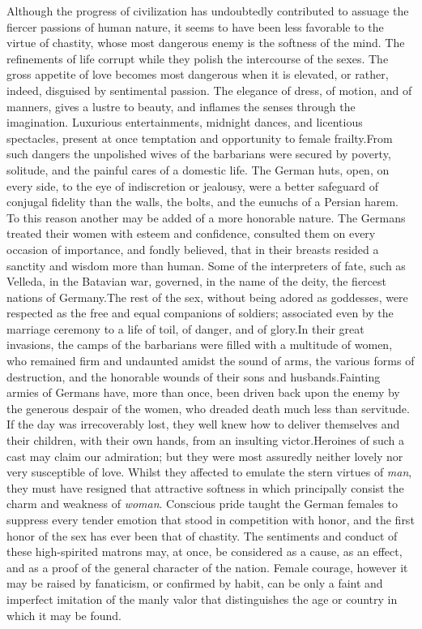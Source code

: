 Although the progress of civilization has undoubtedly contributed
to assuage the fiercer passions of human nature, it seems to have
been less favorable to the virtue of chastity, whose most
dangerous enemy is the softness of the mind. The refinements of
life corrupt while they polish the intercourse of the sexes. The
gross appetite of love becomes most dangerous when it is
elevated, or rather, indeed, disguised by sentimental passion.
The elegance of dress, of motion, and of manners, gives a lustre
to beauty, and inflames the senses through the imagination.
Luxurious entertainments, midnight dances, and licentious
spectacles, present at once temptation and opportunity to female
frailty.\footnotemark[57] From such dangers the unpolished wives of the
barbarians were secured by poverty, solitude, and the painful
cares of a domestic life. The German huts, open, on every side,
to the eye of indiscretion or jealousy, were a better safeguard
of conjugal fidelity than the walls, the bolts, and the eunuchs
of a Persian harem. To this reason another may be added of a more
honorable nature. The Germans treated their women with esteem and
confidence, consulted them on every occasion of importance, and
fondly believed, that in their breasts resided a sanctity and
wisdom more than human. Some of the interpreters of fate, such as
Velleda, in the Batavian war, governed, in the name of the deity,
the fiercest nations of Germany.\footnotemark[58] The rest of the sex, without
being adored as goddesses, were respected as the free and equal
companions of soldiers; associated even by the marriage ceremony
to a life of toil, of danger, and of glory.\footnotemark[59] In their great
invasions, the camps of the barbarians were filled with a
multitude of women, who remained firm and undaunted amidst the
sound of arms, the various forms of destruction, and the
honorable wounds of their sons and husbands.\footnotemark[60] Fainting armies
of Germans have, more than once, been driven back upon the enemy
by the generous despair of the women, who dreaded death much less
than servitude. If the day was irrecoverably lost, they well knew
how to deliver themselves and their children, with their own
hands, from an insulting victor.\footnotemark[61] Heroines of such a cast may
claim our admiration; but they were most assuredly neither lovely
nor very susceptible of love. Whilst they affected to emulate the
stern virtues of \textit{man}, they must have resigned that attractive
softness in which principally consist the charm and weakness of
\textit{woman}. Conscious pride taught the German females to suppress
every tender emotion that stood in competition with honor, and
the first honor of the sex has ever been that of chastity. The
sentiments and conduct of these high-spirited matrons may, at
once, be considered as a cause, as an effect, and as a proof of
the general character of the nation. Female courage, however it
may be raised by fanaticism, or confirmed by habit, can be only a
faint and imperfect imitation of the manly valor that
distinguishes the age or country in which it may be found.

